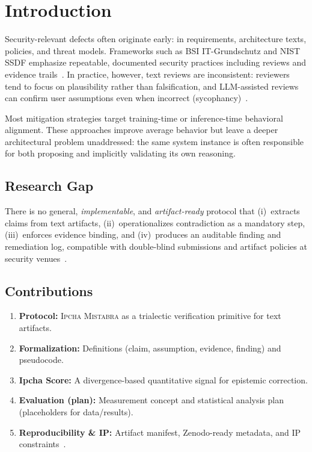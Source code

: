 \documentclass[11pt,a4paper]{article}
\newcommand{\methodname}{\textsc{Ipcha Mistabra}}
\begin{document}
\section{Introduction}
Security-relevant defects often originate early: in requirements, architecture texts, policies, and threat models.
Frameworks such as BSI IT-Grundschutz and NIST SSDF emphasize repeatable, documented security practices including reviews and evidence trails~\cite{bsi_standard_100_2,nist_sp800_218}.
In practice, however, text reviews are inconsistent: reviewers tend to focus on plausibility rather than falsification, and LLM-assisted reviews can confirm user assumptions even when incorrect (sycophancy)~\cite{sharma_sycophancy}.

Most mitigation strategies target training-time or inference-time behavioral alignment.
These approaches improve average behavior but leave a deeper architectural problem unaddressed: the same system instance is often responsible for both proposing and implicitly validating its own reasoning.

\subsection{Research Gap}
There is no general, \emph{implementable}, and \emph{artifact-ready} protocol that
(i)~extracts claims from text artifacts,
(ii)~operationalizes contradiction as a mandatory step,
(iii)~enforces evidence binding, and
(iv)~produces an auditable finding and remediation log,
compatible with double-blind submissions and artifact policies at security venues~\cite{usenix_sec26_cfp,usenix_sec26_artifacts,ccs_2026_cfp}.

\subsection{Contributions}
\begin{enumerate}
  \item \textbf{Protocol:} \methodname{} as a trialectic verification primitive for text artifacts.
  \item \textbf{Formalization:} Definitions (claim, assumption, evidence, finding) and pseudocode.
  \item \textbf{Ipcha Score:} A divergence-based quantitative signal for epistemic correction.
  \item \textbf{Evaluation (plan):} Measurement concept and statistical analysis plan (placeholders for data/results).
  \item \textbf{Reproducibility \& IP:} Artifact manifest, Zenodo-ready metadata, and IP constraints~\cite{zenodo_policies,patg_par3,geschgehg_par2,epue_art54}.
\end{enumerate}
\end{document}
